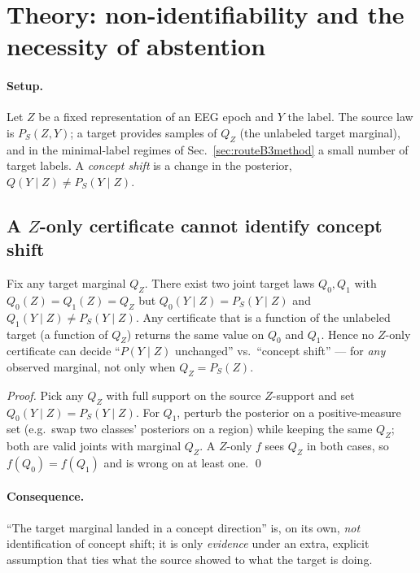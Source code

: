 \section{Theory: non-identifiability and the necessity of abstention}
\label{sec:theory}


\paragraph{Setup.}
Let $Z$ be a fixed representation of an EEG epoch and $Y$ the label. The source law is $P_S(Z,Y)$; a target
provides samples of $Q_Z$ (the unlabeled target marginal), and in the minimal-label regimes of
Sec.~\ref{sec:routeB3method} a small number of target labels. A \emph{concept shift} is a change in the
posterior, $Q(Y\mid Z)\neq P_S(Y\mid Z)$.

\subsection{A $Z$-only certificate cannot identify concept shift}

\begin{proposition}
\label{prop:impossible}
Fix any target marginal $Q_Z$. There exist two joint target laws $Q_0,Q_1$ with
$Q_0(Z)=Q_1(Z)=Q_Z$ but $Q_0(Y\mid Z)=P_S(Y\mid Z)$ and $Q_1(Y\mid Z)\neq P_S(Y\mid Z)$. Any certificate
that is a function of the unlabeled target (a function of $Q_Z$) returns the same value on $Q_0$ and $Q_1$.
Hence no $Z$-only certificate can decide ``$P(Y\mid Z)$ unchanged'' vs.\ ``concept shift'' --- for
\emph{any} observed marginal, not only when $Q_Z=P_S(Z)$.
\end{proposition}

\begin{proof}
Pick any $Q_Z$ with full support on the source $Z$-support and set $Q_0(Y\mid Z)=P_S(Y\mid Z)$. For $Q_1$,
perturb the posterior on a positive-measure set (e.g.\ swap two classes' posteriors on a region) while
keeping the same $Q_Z$; both are valid joints with marginal $Q_Z$. A $Z$-only $f$ sees $Q_Z$ in both cases,
so $f(Q_0)=f(Q_1)$ and is wrong on at least one. \qed
\end{proof}

\paragraph{Consequence.}
``The target marginal landed in a concept direction'' is, on its own, \emph{not} identification of concept
shift; it is only \emph{evidence} under an extra, explicit assumption that ties what the source showed to
what the target is doing.


